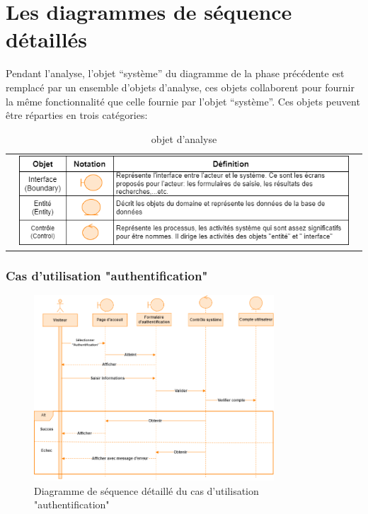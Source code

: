 \documentclass[edit,12pt,a4paper,ChapStyle,oneside,doubleinterligne]{report}
\begin{document}
\section{Les diagrammes de séquence détaillés}
Pendant l’analyse, l’objet “système” du diagramme de la phase précédente est remplacé par un ensemble d’objets d’analyse, ces objets collaborent pour fournir la même fonctionnalité que celle fournie par l’objet “système”. Ces objets peuvent être réparties en trois catégories:
\begin{table}[h!]
    \centering
    \begin{tabular}{c}
        \centering
        \includegraphics[width=0.95\textwidth]{images/objet analyse.png}
    \end{tabular}
    \caption{objet d'analyse}
    \label{tab:objet analyse}
\end{table}
\subsubsection{Cas d'utilisation "authentification"}
\begin{figure}[H]\label{fig:Diagramme cas 1d}
\centering
\includegraphics[width=0.8\textwidth]{images/Authentification d.png}
\caption{Diagramme de séquence détaillé du cas d'utilisation "authentification"}
\end{figure}
\end{document}

